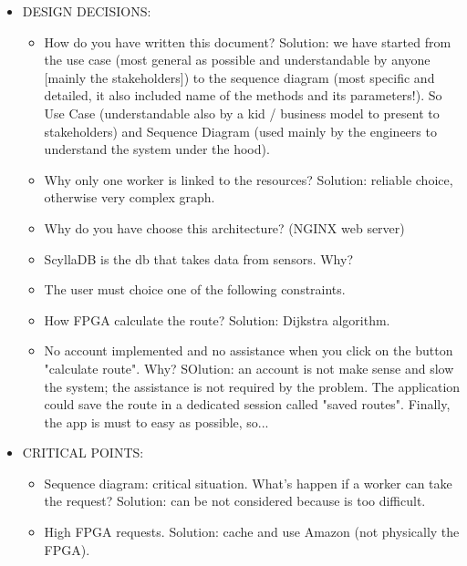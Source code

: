 \documentclass[a4paper]{article}
\begin{document}
    \begin{itemize}
        \item DESIGN DECISIONS:
        \begin{itemize}
            \item How do you have written this document? Solution: we have started from the use case (most general as possible and understandable by anyone [mainly the stakeholders]) to the sequence diagram (most specific and detailed, it also included name of the methods and its parameters!). So Use Case (understandable also by a kid / business model to present to stakeholders) and Sequence Diagram (used mainly by the engineers to understand the system under the hood).
            
            \item Why only one worker is linked to the resources? Solution: reliable choice, otherwise very complex graph.

            \item Why do you have choose this architecture? (NGINX web server)

            \item ScyllaDB is the db that takes data from sensors. Why?
            
            \item The user must choice one of the following constraints.

            \item How FPGA calculate the route? Solution: Dijkstra algorithm.
            
            \item No account implemented and no assistance when you click on the button "calculate route". Why? SOlution: an account is not make sense and slow the system; the assistance is not required by the problem. The application could save the route in a dedicated session called "saved routes". Finally, the app is must to easy as possible, so...
        \end{itemize}

        \item CRITICAL POINTS:
        \begin{itemize}
            \item Sequence diagram: critical situation. What's happen if a worker can take the request? Solution: can be not considered because is too difficult.

            \item High FPGA requests. Solution: cache and use Amazon (not physically the FPGA).
            

\end{itemize}
\end{itemize}
\end{document}
